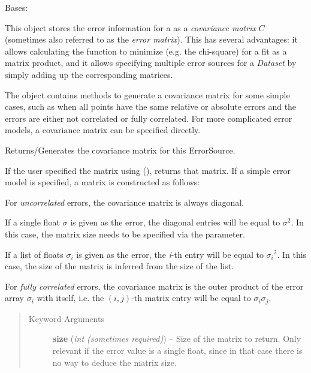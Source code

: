 \documentclass[a4paper,10pt,english]{sphinxmanual}
\begin{document}
\begin{fulllineitems}
\label{index:kafe.dataset.ErrorSource}
Bases: 

This object stores the error information for a  as a
\emph{covariance matrix} \(C\) (sometimes also referred to as the \emph{error
matrix}). This has several advantages: it allows calculating the function
to minimize (e.g. the chi-square) for a fit as a matrix product, and it
allows specifying multiple error sources for a \emph{Dataset} by simply adding
up the corresponding matrices.

The object contains methods to generate a covariance matrix for some
simple cases, such as when all points have the same relative or absolute
errors and the errors are either not correlated or fully correlated. For
more complicated error models, a covariance matrix can be specified
directly.

\begin{fulllineitems}
\label{index:kafe.dataset.ErrorSource.get_matrix}
Returns/Generates the covariance matrix for this ErrorSource.

If the user specified the matrix using
{\hyperref[index:kafe.dataset.ErrorSource.make_from_matrix]{\emph{}}} (),
returns that matrix. If a simple error model is specified, a matrix is
constructed as follows:

For \emph{uncorrelated} errors, the covariance matrix is always diagonal.

If a single float \(\sigma\) is given as the error, the diagonal
entries will be equal to \(\sigma^2\). In this case, the matrix
size needs to be specified via the  parameter.

If a list of floats \(\sigma_i\) is given as the error, the
\emph{i}-th entry will be equal to \({\sigma_i}^2\). In this case,
the size of the matrix is inferred from the size of the list.

For \emph{fully correlated} errors, the covariance matrix is the outer
product of the error array \(\sigma_i\) with itself, i.e. the
\((i,j)\)-th matrix entry will be equal to
\(\sigma_i\sigma_j\).
\begin{quote}\begin{description}
\item[{Keyword Arguments}] \leavevmode
\textbf{size} (\emph{int (sometimes required)}) --
Size of the matrix to return. Only relevant if the error value
is a single float, since in that case there is no way to deduce
the matrix size.


\end{description}
\end{quote}
\end{fulllineitems}
\end{fulllineitems}
\end{document}
